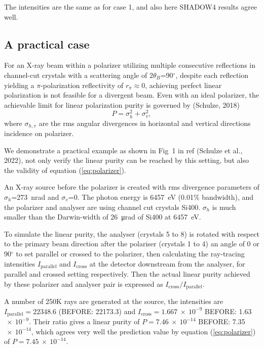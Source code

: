 \documentclass{iucr}
\newcommand{\inred}[1]{{\color{red}#1}}
\begin{document}
The intensities are the same as for case 1, and also here SHADOW4 results agree well. 

\subsection{A practical case}\label{sec:polarizers45degPractical}

For an X-ray beam within a polarizer utilizing multiple consecutive reflections in channel-cut crystals with a scattering angle of $2\theta_B$=90$^\circ$, despite each reflection yielding a $\pi$-polarization reflectivity of $r_\pi\approx 0$, achieving perfect linear polarization is not feasible for a divergent beam.
Even with an ideal polarizer, the achievable limit for linear polarization purity is governed by (Schulze, 2018)
\begin{equation}\label{eq:polarizer}
    P = \sigma_h^2 + \sigma_v^2,
\end{equation}
where $\sigma_{h,v}$ are the rms angular divergences in horizontal and vertical directions incidence on polarizer.

We demonstrate a practical example as shown in Fig~1 in ref (Schulze et al., 2022), not only verify the linear purity can be reached by this setting, but also the validity of equation (\ref{eq:polarizer}).

An X-ray source before the polarizer is created with rms divergence parameters of $\sigma_h$=\SI{273}{\nano\radian} and $\sigma_v$=0.
The photon energy is \SI{6457}{eV} (0.01\% bandwidth), and the polarizer and analyser are using channel cut crystals Si400.
$\sigma_h$ is much smaller than the Darwin-width of \SI{26}{\micro\radian} of Si400 at \SI{6457}{eV}.

To simulate the linear purity, the analyser (crystals 5 to 8) is rotated with respect to the primary beam direction after the polariser (crystals 1 to 4) an angle of 0 or 90$^\circ$ to set parallel or crossed to the polarizer, then calculating the ray-tracing intensities $I_\text{parallel}$ and $I_\text{cross}$ at the detector downstream from the analyser, for parallel and crossed setting respectively.
Then the actual linear purity achieved by these polarizer and analyser pair is expressed as $I_\text{cross}/I_\text{parallel}$.

A number of 250K rays are generated at the source, the intensities are $I_\text{parallel}=22348.6$ \inred{(BEFORE: 22173.3)} and $I_\text{cross}=1.667~\times~10^{-9}$ \inred{BEFORE: 1.63$~\times~10^{-9}$}.
Their ratio gives a linear purity of $P=7.46~\times~10^{-14}$ \inred{BEFORE: 7.35$~\times~10^{-14}$}, which agrees very well the prediction value by equation (\ref{eq:polarizer}) of $P=7.45~\times~10^{-14}$.
\end{document}
